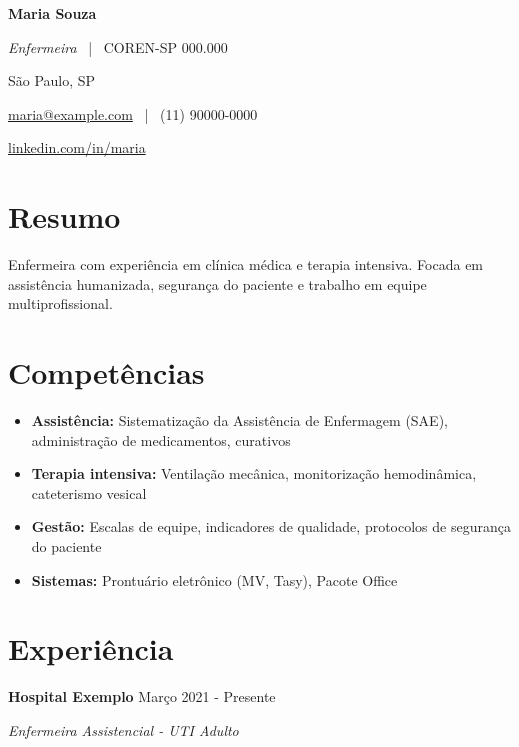 \documentclass[a4paper,10pt]{article}
\begin{document}
\begin{center}
    {\LARGE \textbf{Maria Souza}}

    \textit{Enfermeira} \ | \ COREN-SP 000.000

    São Paulo, SP

    \href{mailto:maria@example.com}{maria@example.com} \ | \ (11) 90000-0000

    \href{https://linkedin.com/in/maria}{linkedin.com/in/maria}
\end{center}

\vspace{8pt}


\section*{Resumo}
Enfermeira com experiência em clínica médica e terapia intensiva.
Focada em assistência humanizada, segurança do paciente e trabalho em equipe multiprofissional.

\section*{Competências}

\begin{itemize}[leftmargin=*, itemsep=4pt]
    \item \textbf{Assistência:} Sistematização da Assistência de Enfermagem (SAE), administração de medicamentos, curativos
    \item \textbf{Terapia intensiva:} Ventilação mecânica, monitorização hemodinâmica, cateterismo vesical
    \item \textbf{Gestão:} Escalas de equipe, indicadores de qualidade, protocolos de segurança do paciente
    \item \textbf{Sistemas:} Prontuário eletrônico (MV, Tasy), Pacote Office
\end{itemize}

\section*{Experiência}

\textbf{Hospital Exemplo} \hfill Março 2021 - Presente

\textit{Enfermeira Assistencial - UTI Adulto}
\end{document}

